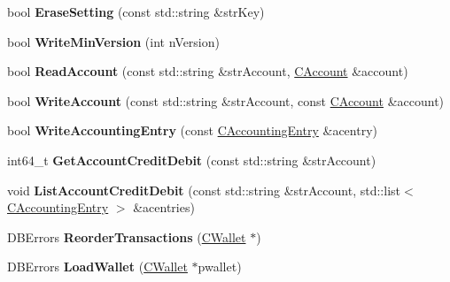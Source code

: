 \begin{DoxyCompactItemize}
\item 
\mbox{\label{class_c_wallet_d_b_a60f0fb245235f9ed54182ee5246f79af}} 
bool {\bfseries Erase\+Setting} (const std\+::string \&str\+Key)
\item 
\mbox{\label{class_c_wallet_d_b_ab008b6c6e09a60a988cac6e1a9e11886}} 
bool {\bfseries Write\+Min\+Version} (int n\+Version)
\item 
\mbox{\label{class_c_wallet_d_b_afa8d9d374072629b360adb49b9bdd584}} 
bool {\bfseries Read\+Account} (const std\+::string \&str\+Account, \mbox{\hyperlink{class_c_account}{C\+Account}} \&account)
\item 
\mbox{\label{class_c_wallet_d_b_afef640a4990f74fd5af7178c99415cf3}} 
bool {\bfseries Write\+Account} (const std\+::string \&str\+Account, const \mbox{\hyperlink{class_c_account}{C\+Account}} \&account)
\item 
\mbox{\label{class_c_wallet_d_b_a958a0138b171e213be35f48933adcb89}} 
bool {\bfseries Write\+Accounting\+Entry} (const \mbox{\hyperlink{class_c_accounting_entry}{C\+Accounting\+Entry}} \&acentry)
\item 
\mbox{\label{class_c_wallet_d_b_a7b853e605ddba528896e60c766b59075}} 
int64\+\_\+t {\bfseries Get\+Account\+Credit\+Debit} (const std\+::string \&str\+Account)
\item 
\mbox{\label{class_c_wallet_d_b_a51555c82291fe16081880110541e207f}} 
void {\bfseries List\+Account\+Credit\+Debit} (const std\+::string \&str\+Account, std\+::list$<$ \mbox{\hyperlink{class_c_accounting_entry}{C\+Accounting\+Entry}} $>$ \&acentries)
\item 
\mbox{\label{class_c_wallet_d_b_afc27d9c9eef8b31851e6b02dc3191425}} 
D\+B\+Errors {\bfseries Reorder\+Transactions} (\mbox{\hyperlink{class_c_wallet}{C\+Wallet}} $\ast$)
\item 
\mbox{\label{class_c_wallet_d_b_a14f26e53502d1a60dd2b034f830acf03}} 
D\+B\+Errors {\bfseries Load\+Wallet} (\mbox{\hyperlink{class_c_wallet}{C\+Wallet}} $\ast$pwallet)
\end{DoxyCompactItemize}
